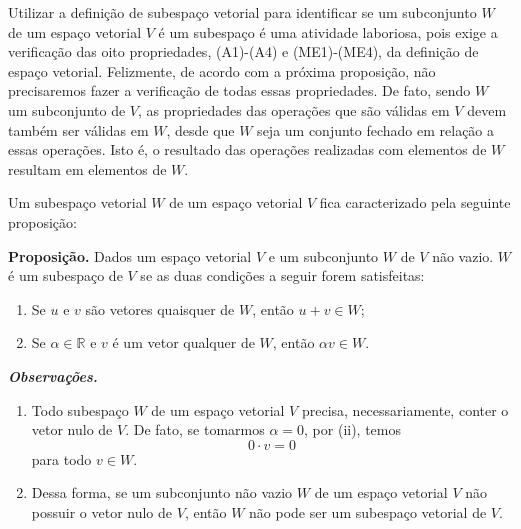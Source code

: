 
Utilizar a definição de subespaço vetorial para  identificar se um subconjunto $W$  de um espaço vetorial $V$  é um subespaço é  uma atividade laboriosa, pois exige a verificação das oito propriedades,  (A1)-(A4) e (ME1)-(ME4), da definição de espaço vetorial. Felizmente, de acordo com a  próxima proposição,  não precisaremos fazer  a verificação de todas essas propriedades. De fato, sendo  $W$  um subconjunto de $V$,  as propriedades  das operações que são válidas em $V$ devem também ser válidas em $W$, desde que $W$ seja um conjunto fechado em relação a essas operações. Isto é, o resultado das operações realizadas com elementos de $W$  resultam em elementos de $W$.

 Um subespaço vetorial $W$ de um espaço vetorial $V$  fica caracterizado pela seguinte proposição:

\textbf{Proposição.} Dados um espaço vetorial $V$ e  um subconjunto $W$ de $V$   não vazio. $W$ é um subespaço de  $V$ se as duas condições a seguir  forem satisfeitas:

\begin{enumerate}[label=(\roman*)]
\item Se $u$ e $v$ são vetores quaisquer de $W$, então $u+v \in W$;
\item Se  $ \alpha \in \mathbb{R}$ e $ v$ é um vetor qualquer de $W$, então $\alpha v\in W$.

\end{enumerate}

\textbf{\textit{Observações.}}
\begin{enumerate}%
\item Todo subespaço $W$ de um espaço vetorial $V$ precisa, necessariamente, conter o vetor nulo de $V$. De fato, se tomarmos $\alpha=0$, por (ii),  temos $$0\cdot v=0 $$ para todo $v \in W$.

\item Dessa forma,  se um subconjunto não vazio  $W$ de um espaço vetorial $V$ não possuir o vetor nulo de $V$,  então $W$ não pode ser um subespaço vetorial de $V$.
\end{enumerate}

